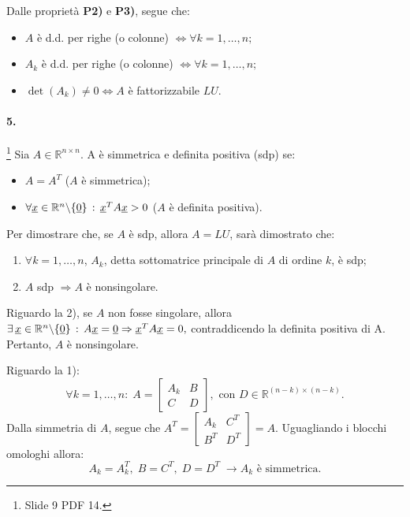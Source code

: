 \noindent Dalle proprietà \textbf{P2)} e \textbf{P3)}, segue che:
\begin{itemize}
    \item $A$ è d.d. per righe (o colonne) $\iff\forall k=1,\hdots,n;$
    \item $A_k$ è d.d. per righe (o colonne) $\iff\forall k=1,\hdots,n;$
    \item $\det(A_k)\neq 0\iff A$ è fattorizzabile $LU.$
\end{itemize}

\paragraph{5.}\footnote{Slide 9 PDF 14.} Sia $A\in\mathbb R^{n\times n}.$ A è simmetrica e definita positiva (sdp) se:
\begin{itemize}
    \item $A=A^T$ ($A$ è simmetrica);
    \item $\forall \uline x\in\mathbb R^n\backslash\{\uline 0\}\,:\, \uline x^T A \uline x > 0$ ($A$ è definita positiva).
\end{itemize}
Per dimostrare che, se $A$ è sdp, allora $A=LU$, sarà dimostrato che:
\begin{enumerate}
    \item $\forall k=1,\hdots, n$, $A_k$, detta sottomatrice principale di $A$ di ordine $k$, è sdp;
    \item $A$ sdp $\Rightarrow A$ è nonsingolare.
\end{enumerate}

\noindent Riguardo la 2), se $A$ non fosse singolare, allora $\exists\,\uline x\in\mathbb R^n\backslash\{\uline 0\}\, : \, A\uline x=\uline 0\Rightarrow\uline x^T A \uline x = 0,$ contraddicendo la definita positiva di A.
Pertanto, $A$ è nonsingolare.

\noindent Riguardo la 1): 
\begin{equation}\label{eq:ACompSimm}
\forall k=1,\hdots,n:\; 
A=\left[\begin{array}{c|c}
       A_k & B\\
       \hline
       C& D
    \end{array}
    \right],\text{ con } D\in\mathbb R^{(n-k)\times (n-k)}.    
\end{equation}
Dalla simmetria di $A$, segue che 
$A^T=\left[
\begin{array}{c|c}
    A_k & C^T\\
    \hline
    B^T & D^T
\end{array}
\right]=A.$ Uguagliando i blocchi omologhi allora:
\begin{equation*}
    A_k=A_k^T,\; B=C^T,\; D=D^T\;\rightarrow A_k \text{ è simmetrica.}
\end{equation*}

